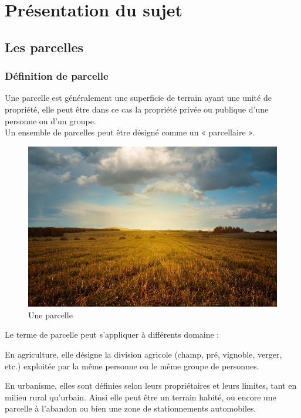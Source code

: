 \documentclass[12pt, openany]{report}
\begin{document}
\chapter{Présentation du sujet}
\section{Les parcelles}

\subsection{Définition de parcelle}
Une parcelle est généralement une superficie de terrain ayant une unité de propriété, elle peut être dans ce cas la propriété privée ou publique d'une personne ou d'un groupe.\\
Un ensemble de parcelles peut être désigné comme un « parcellaire ». 

\begin{figure}[hp]
\centering
\includegraphics[scale=0.4]{parcelle2.jpg}
\caption{Une parcelle}
\end{figure}


Le terme de parcelle peut s'appliquer à différents domaine :

\begin{mylist}

\item En agriculture, elle désigne la division agricole (champ, pré, vignoble, verger, etc.) exploitée par la même personne ou le même groupe de personnes.


\item En urbanisme, elles sont définies selon leurs propriétaires et leurs limites, tant en milieu rural qu'urbain. Ainsi elle peut être un terrain habité, ou encore une parcelle à l'abandon ou bien une zone de stationnements automobiles. 

\end{mylist}
\end{document}
